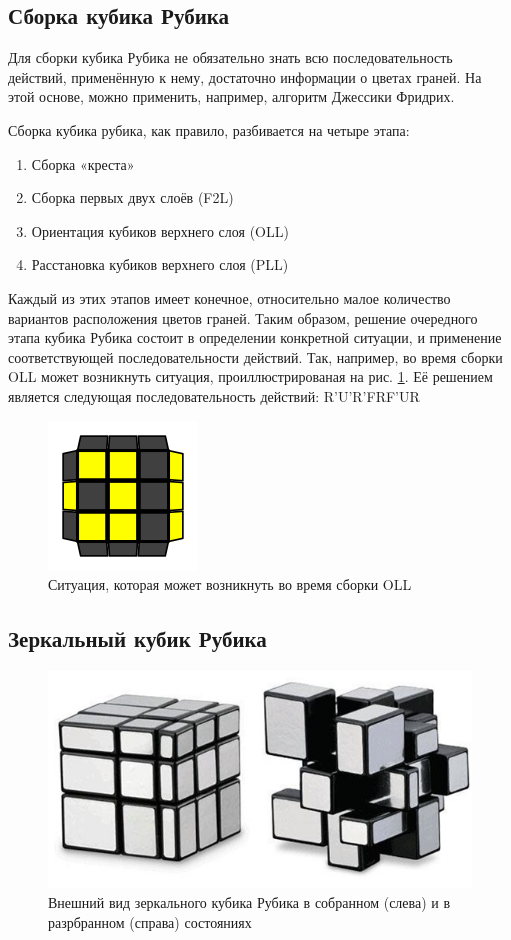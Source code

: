 \documentclass[a4paper, 14pt]{report} %
\begin{document}
	\subsection{Сборка кубика Рубика}
	Для сборки кубика Рубика не обязательно знать всю последовательность действий, применённую к нему, достаточно информации о цветах граней. На этой основе, можно применить, например, алгоритм Джессики Фридрих.
	
	Сборка кубика рубика, как правило, разбивается на четыре этапа:
	\begin{enumerate}
		\item Сборка «креста»
		\item Сборка первых двух слоёв (F2L)
		\item Ориентация кубиков верхнего слоя (OLL)
		\item Расстановка кубиков верхнего слоя (PLL)
	\end{enumerate}
	
	Каждый из этих этапов имеет конечное, относительно малое количество вариантов расположения цветов граней. Таким образом, решение очередного этапа кубика Рубика состоит в определении конкретной ситуации, и применение соответствующей последовательности действий. Так, например, во время сборки OLL может возникнуть ситуация, проиллюстрированая на рис. \ref{fig:c_shape}. Её решением является следующая последовательность действий: R'U'R'FRF'UR
	
	\begin{figure}[ht]
		\centering
		\includegraphics[width=0.25\linewidth]{c_shape}
		\caption{Ситуация, которая может возникнуть во время сборки OLL}
		\label{fig:c_shape}
	\end{figure}
		
	\subsection{Зеркальный кубик Рубика}
	\begin{figure}[ht]
		\centering
		\includegraphics[width=1\linewidth]{mirrored_rubics_cube}
		\caption{Внешний вид зеркального кубика Рубика в собранном (слева) и в разрбранном (справа) состояниях}
		\label{fig:mirrored_cube}
	\end{figure}
\end{document}
